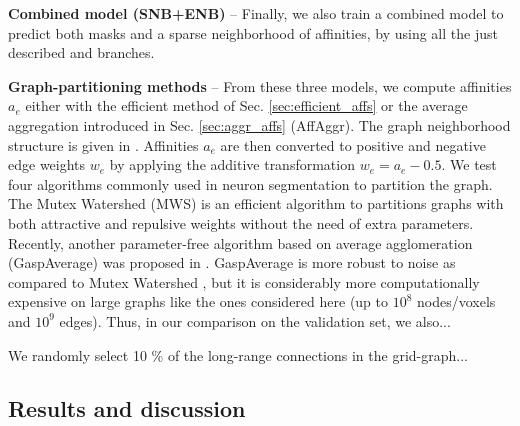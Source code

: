 \textbf{Combined model (SNB+ENB)} -- Finally, we also train a combined model to predict both \maskname masks and a sparse neighborhood of affinities, by using all the just described \emph{\encBr} and \emph{\sparseBr} branches.  

\textbf{Graph-partitioning methods} -- From these three models, we compute affinities $a_e$ either with the efficient method of Sec. \ref{sec:efficient_affs} or the average aggregation introduced in Sec. \ref{sec:aggr_affs} (AffAggr). The graph neighborhood structure is given in . Affinities $a_e$ are then converted to positive and negative edge weights $w_e$ by applying the additive transformation $w_e=a_e-0.5$.
We test four algorithms commonly used in neuron segmentation to partition the graph. The Mutex Watershed (MWS) \cite{wolf2018mutex} is an efficient algorithm to partitions graphs with both attractive and repulsive weights without the need of extra parameters. Recently, another parameter-free algorithm based on average agglomeration (GaspAverage) was proposed in \cite{bailoni2019generalized}. GaspAverage is more robust to noise as compared to Mutex Watershed \cite{bailoni2019generalized}, but it is considerably more computationally expensive on large graphs like the ones considered here (up to $10^8$ nodes/voxels and $10^9$ edges). Thus, in our comparison on the validation set, we also... 

We randomly select 10 \% of the long-range connections in the grid-graph...



\subsection{Results and discussion}



